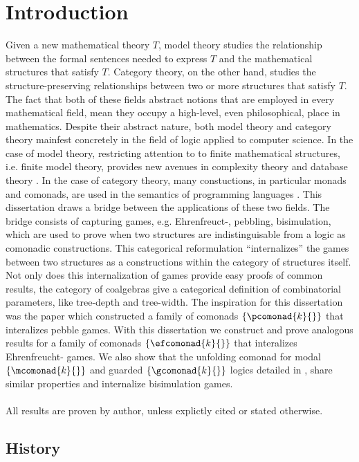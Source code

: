 \chapter{Introduction} 
Given a new mathematical theory $T$, model theory studies the relationship between the formal sentences needed to express $T$ and the mathematical structures that satisfy $T$. Category theory, on the other hand, studies the structure-preserving relationships between two or more structures that satisfy $T$. The fact that both of these fields abstract notions that are employed in every mathematical field, mean they occupy a high-level, even philosophical\cite{Mancosu2010}\cite{}, place in mathematics. Despite their abstract nature, both model theory and category theory mainfest concretely in the field of logic applied to computer science. In the case of model theory, restricting attention to to finite mathematical structures, i.e. finite model theory, provides new avenues in complexity theory \cite{Immerman1998} and database theory \cite{Abiteboul1995}. In the case of category theory, many constuctions, in particular monads and comonads, are used in the semantics of programming languages \cite{BrookesGeva1992}. This dissertation draws a bridge between the applications of these two fields. The bridge consists of capturing games, e.g. Ehrenfreuct-{\Fraisse}, pebbling, bisimulation, which are used to prove when two structures are indistinguisable from a logic as comonadic constructions. This categorical reformulation ``internalizes'' the games between two structures as a constructions within the category of structures itself. Not only does this internalization of games provide easy proofs of common results, the category of coalgebras give a categorical definition of combinatorial parameters, like tree-depth and tree-width. The inspiration for this dissertation was the paper \cite{Abramsky2017} which constructed a family of comonads $\{\pcomonad{k}{}\}$ that interalizes pebble games. With this dissertation we construct and prove analogous results for a family of comonads $\{\efcomonad{k}{}\}$ that interalizes Ehrenfreucht-{\Fraisse} games. We also show that the unfolding comonad for modal $\{\mcomonad{k}{}\}$ and guarded $\{\gcomonad{k}{}\}$ logics detailed in \cite{Gradel2014}, share similar properties and internalize bisimulation games.  
\\~\\
\noindent All results are proven by author, unless explictly cited or stated otherwise. 
\section{History}
